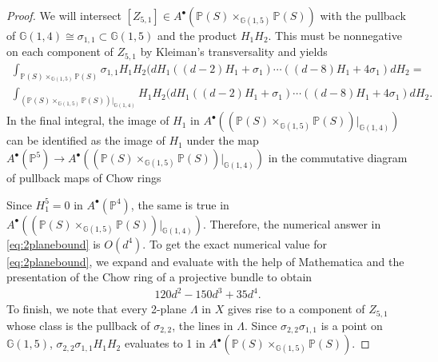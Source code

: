 \documentclass[12pt,reqno]{amsart}
\theoremstyle{plain}
\theoremstyle{remark}
\numberwithin{equation}{section}
\renewcommand{\to}{{\longrightarrow}}
\numberwithin{equation}{section}
\begin{document}
\begin{proof}
We will intersect $[Z_{5,1}]\in A^{\bullet}(\mathbb{P}(S)\times_{\mathbb{G}(1,5)}\mathbb{P}(S))$ with the pullback of $\mathbb{G}(1,4)\cong \sigma_{1,1}\subset \mathbb{G}(1,5)$ and the product $H_1H_2$. This must be nonnegative on each component of $Z_{5,1}$ by Kleiman's transversality \cite[Theorem 1.7]{3264} and yields
\begin{align}
    \int_{\mathbb{P}(S)\times_{\mathbb{G}(1,5)}\mathbb{P}(S)}\sigma_{1,1}H_1H_2( dH_1((d-2)H_1+\sigma_1)\cdots((d-8)H_1+4\sigma_1)dH_2=\nonumber\\
        \int_{(\mathbb{P}(S)\times_{\mathbb{G}(1,5)}\mathbb{P}(S))|_{\mathbb{G}(1,4)}}H_1H_2( dH_1((d-2)H_1+\sigma_1)\cdots((d-8)H_1+4\sigma_1)dH_2.\label{eq:2planebound}
\end{align}
In the final integral, the image of $H_1$ in $A^{\bullet}((\mathbb{P}(S)\times_{\mathbb{G}(1,5)}\mathbb{P}(S))|_{\mathbb{G}(1,4)})$ can be identified as the image of $H_1$ under the map $A^{\bullet}(\mathbb{P}^5)\to A^{\bullet}((\mathbb{P}(S)\times_{\mathbb{G}(1,5)}\mathbb{P}(S))|_{\mathbb{G}(1,4)})$ in the commutative diagram of pullback maps of Chow rings
\begin{center}
\end{center}
Since $H_1^5=0$ in $A^{\bullet}(\mathbb{P}^4)$, the same is true in $A^{\bullet}((\mathbb{P}(S)\times_{\mathbb{G}(1,5)}\mathbb{P}(S))|_{\mathbb{G}(1,4)})$. Therefore, the numerical answer in \eqref{eq:2planebound} is $O(d^4)$. To get the exact numerical value for \eqref{eq:2planebound}, we expand and evaluate with the help of Mathematica and the presentation of the Chow ring of a projective bundle \cite[Theorem 9.6]{3264} to obtain
\begin{align*}
    120 d^2 - 150 d^3 + 35 d^4.
\end{align*}
To finish, we note that every 2-plane $\Lambda$ in $X$ gives rise to a component of $Z_{5,1}$ whose class is the pullback of $\sigma_{2,2}$, the lines in $\Lambda$. Since $\sigma_{2,2}\sigma_{1,1}$ is a point on $\mathbb{G}(1,5)$, $\sigma_{2,2}\sigma_{1,1}H_1H_2$ evaluates to 1 in $A^{\bullet}(\mathbb{P}(S)\times_{\mathbb{G}(1,5)}\mathbb{P}(S))$. 

\end{proof}
\end{document}
